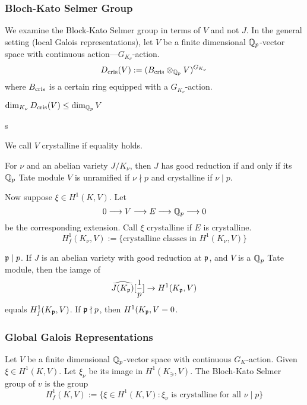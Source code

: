 \subsubsection{Bloch-Kato Selmer Group}

We examine the Block-Kato Selmer group in terms of $V$ and not $J$. In the general setting (local Galois representations), let $V$ be a finite dimensional $\mathbb{Q}_p$-vector space with continuous action---$G_{K_\nu}$-action. 
	\[
	D_{\text{cris}}(V):= (B_{\text{cris}} \otimes_{\mathbb{Q}_p} V)^{G_{K_\nu}}
	\]
where $B_{\text{cris}}$ is a certain ring equipped with a $G_{K_\nu}$-action. 


\begin{rem}
$\dim_{K_\nu} D_{\text{cris}}(V) \leq \dim_{\mathbb{Q}_p} V$
\end{rem}s


\begin{dfn}[Crystalline]
We call $V$ crystalline if equality holds. 
\end{dfn}


\begin{rem}
For $\nu$ and an abelian variety $J/K_\nu$, then $J$ has good reduction if and only if its $\mathbb{Q}_p$ Tate module $V$ is unramified if $\nu \nmid p$ and crystalline if $\nu \mid p$. 
\end{rem}


Now suppose $\xi \in H^1(K,V)$. Let
	\[
	0 \stackrel{}{\longrightarrow} V \stackrel{}{\longrightarrow} E \stackrel{}{\longrightarrow} \mathbb{Q}_p \stackrel{}{\longrightarrow} 0
	\]
be the corresponding extension. Call $\xi$ crystalline if $E$ is crystalline. 
	\[
	H_f^1(K_\nu,V):= \{ \text{crystalline classes in } H^1(K_\nu,V) \}
	\]


\begin{rem}
$\mathfrak{p} \mid p$. If $J$ is an abelian variety with good reduction at $\mathfrak{p}$, and $V$ is a $\mathbb{Q}_p$ Tate module, then the iamge of
	\[
	\widehat{J(K_{\mathfrak{p}})}[\frac{1}{p}] \to H^1(K_{\mathfrak{p}},V)
	\]
equals $H_f^1(K_{\mathfrak{p}},V)$. If $\mathfrak{p} \nmid p$, then $H^1(K_{\mathfrak{p}},V= 0$.
\end{rem}



\subsubsection{Global Galois Representations}

Let $V$ be a finite dimensional $\mathbb{Q}_p$-vector space with continuous $G_K$-action. Given $\xi \in H^1(K,V)$. Let $\xi_\nu$ be its image in $H^1(K_\ni,V)$. The Bloch-Kato Selmer group of $v$ is the group
	\[
	H_f^1(K,V):= \{ \xi \in H^1(K,V) \colon \xi_\nu \text{ is crystalline for all } \nu \mid p \}
	\]



